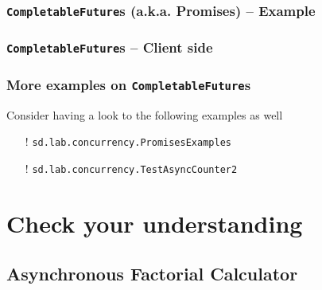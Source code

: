 \documentclass{beamer}\mode<presentation>{\usetheme{AMSCesenaPurpleAndGold}}
\begin{document}
\begin{frame}%
\frametitle{\texttt{CompletableFuture}s (a.k.a. Promises) -- Example}

	

\end{frame}

\begin{frame}%
\frametitle{\texttt{CompletableFuture}s -- Client side}

	

\end{frame}

\begin{frame}[c]
\frametitle{More examples on \texttt{CompletableFuture}s}

	Consider having a look to the following examples as well
	\begin{itemize}
		\item[!] \texttt{sd.lab.concurrency.\alert{PromisesExamples}}
		\item[!] \texttt{sd.lab.concurrency.\alert{TestAsyncCounter2}}
	\end{itemize}

\end{frame}

\section{Check your understanding}

\startExercise

\subsection{Asynchronous Factorial Calculator}
\end{document}
